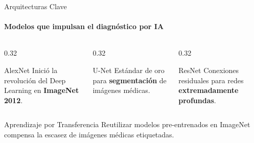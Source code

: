 \begin{frame}{Arquitecturas Clave}
\framesubtitle{Modelos que impulsan el diagnóstico por IA}

\begin{columns}[T]
\begin{column}{0.32\textwidth}
\begin{alertblock}{\centering AlexNet}
\centering
Inició la revolución del Deep Learning en \textbf{ImageNet 2012}.
\end{alertblock}
\end{column}
\begin{column}{0.32\textwidth}
\begin{alertblock}{\centering U-Net}
\centering
Estándar de oro para \textbf{segmentación} de imágenes médicas.
\end{alertblock}
\end{column}
\begin{column}{0.32\textwidth}
\begin{alertblock}{\centering ResNet}
\centering
Conexiones residuales para redes \textbf{extremadamente profundas}.
\end{alertblock}
\end{column}
\end{columns}

\vfill

\begin{block}{\faLightbulb[regular]\; Aprendizaje por Transferencia}
Reutilizar modelos pre-entrenados en ImageNet compensa la escasez de imágenes médicas etiquetadas.
\end{block}

\end{frame}
